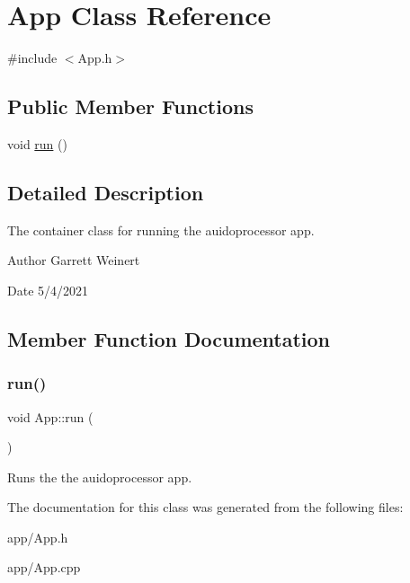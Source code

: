 \hypertarget{classApp}{}\section{App Class Reference}
\label{classApp}


{\ttfamily \#include $<$App.\+h$>$}

\subsection*{Public Member Functions}
\begin{DoxyCompactItemize}
\item 
void \hyperlink{classApp_ae09dc71078b64c56c673b1ad1d25b5d1}{run} ()
\end{DoxyCompactItemize}


\subsection{Detailed Description}
The container class for running the auidoprocessor app. \begin{DoxyAuthor}{Author}
Garrett Weinert 
\end{DoxyAuthor}
\begin{DoxyDate}{Date}
5/4/2021 
\end{DoxyDate}


\subsection{Member Function Documentation}
\mbox{\label{classApp_ae09dc71078b64c56c673b1ad1d25b5d1}} 
\subsubsection{\texorpdfstring{run()}{run()}}
{\footnotesize\ttfamily void App\+::run (\begin{DoxyParamCaption}{ }\end{DoxyParamCaption})}

Runs the the auidoprocessor app. 

The documentation for this class was generated from the following files\+:\begin{DoxyCompactItemize}
\item 
app/App.\+h\item 
app/App.\+cpp\end{DoxyCompactItemize}
